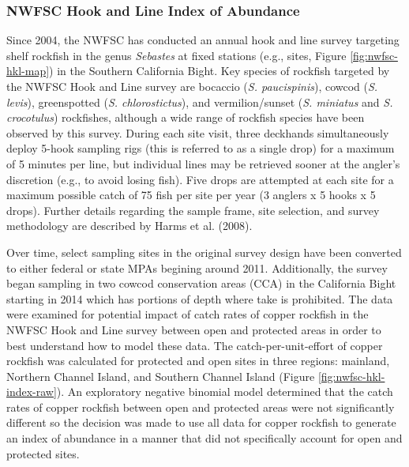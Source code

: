 \documentclass[11pt,
  english,
  letterpaper,
]{article}
\begin{document}
\newpage

\hypertarget{nwfsc-hkl-model}{%
\subsubsection{NWFSC Hook and Line Index of Abundance}\label{nwfsc-hkl-model}}

Since 2004, the NWFSC has conducted an annual hook and line survey targeting shelf rockfish in the genus \emph{Sebastes} at fixed stations (e.g., sites, Figure \ref{fig:nwfsc-hkl-map}) in the Southern California Bight. Key species of rockfish targeted by the NWFSC Hook and Line survey are bocaccio (\emph{S. paucispinis}), cowcod (\emph{S. levis}), greenspotted (\emph{S. chlorostictus}), and vermilion/sunset (\emph{S. miniatus} and \emph{S. crocotulus}) rockfishes, although a wide range of rockfish species have been observed by this survey. During each site visit, three deckhands simultaneously deploy 5-hook sampling rigs (this is referred to as a single drop) for a maximum of 5 minutes per line, but individual lines may be retrieved sooner at the angler's discretion (e.g., to avoid losing fish). Five drops are attempted at each site for a maximum possible catch of 75 fish per site per year (3 anglers x 5 hooks x 5 drops). Further details regarding the sample frame, site selection, and survey methodology are described by Harms et al. (2008).

Over time, select sampling sites in the original survey design have been converted to either federal or state MPAs begining around 2011. Additionally, the survey began sampling in two cowcod conservation areas (CCA) in the California Bight starting in 2014 which has portions of depth where take is prohibited. The data were examined for potential impact of catch rates of copper rockfish in the NWFSC Hook and Line survey between open and protected areas in order to best understand how to model these data. The catch-per-unit-effort of copper rockfish was calculated for protected and open sites in three regions: mainland, Northern Channel Island, and Southern Channel Island (Figure \ref{fig:nwfsc-hkl-index-raw}). An exploratory negative binomial model determined that the catch rates of copper rockfish between open and protected areas were not significantly different so the decision was made to use all data for copper rockfish to generate an index of abundance in a manner that did not specifically account for open and protected sites.
\end{document}
